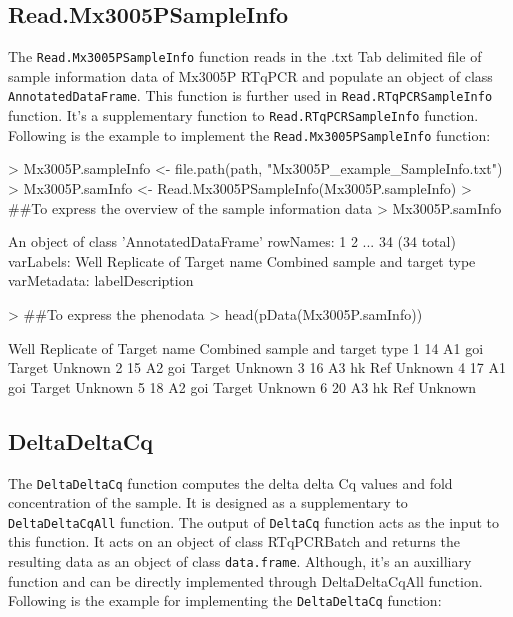 \documentclass[11pt]{article}
\newcommand{\code}[1]{{\tt #1}}
\begin{document}
\subsection{Read.Mx3005PSampleInfo} 
The \code{Read.Mx3005PSampleInfo} function reads in the .txt Tab delimited file of sample information data of Mx3005P RTqPCR and populate an object of class \code{AnnotatedDataFrame}. This function is further used in \code{Read.RTqPCRSampleInfo} function. It's a supplementary function to \code{Read.RTqPCRSampleInfo} function. 
Following is the example to implement the \code{Read.Mx3005PSampleInfo} function:

\begin{Schunk}
\begin{Sinput}
> Mx3005P.sampleInfo <- file.path(path, "Mx3005P_example_SampleInfo.txt")
> Mx3005P.samInfo <- Read.Mx3005PSampleInfo(Mx3005P.sampleInfo)
> ##To express the overview of the sample information data
> Mx3005P.samInfo 
\end{Sinput}
\begin{Soutput}
An object of class 'AnnotatedDataFrame'
  rowNames: 1 2 ... 34 (34 total)
  varLabels: Well Replicate of Target name Combined sample and target
    type
  varMetadata: labelDescription
\end{Soutput}
\begin{Sinput}
> ##To express the phenodata
> head(pData(Mx3005P.samInfo))
\end{Sinput}
\begin{Soutput}
  Well Replicate of Target name Combined sample and target type
1   14           A1         goi                  Target Unknown
2   15           A2         goi                  Target Unknown
3   16           A3          hk                     Ref Unknown
4   17           A1         goi                  Target Unknown
5   18           A2         goi                  Target Unknown
6   20           A3          hk                     Ref Unknown
\end{Soutput}
\end{Schunk}

\subsection{DeltaDeltaCq} 
The \code{DeltaDeltaCq} function computes the delta delta Cq values and fold concentration of the sample. It is designed as a supplementary to \code{DeltaDeltaCqAll} function. The output of \code{DeltaCq} function acts as the input to this function. It acts on an object of class {RTqPCRBatch} and returns the resulting data as an object of class \code{data.frame}. Although, it's an auxilliary function and can be directly implemented through 
DeltaDeltaCqAll function. Following is the example for implementing the \code{DeltaDeltaCq} function:
\end{document}

